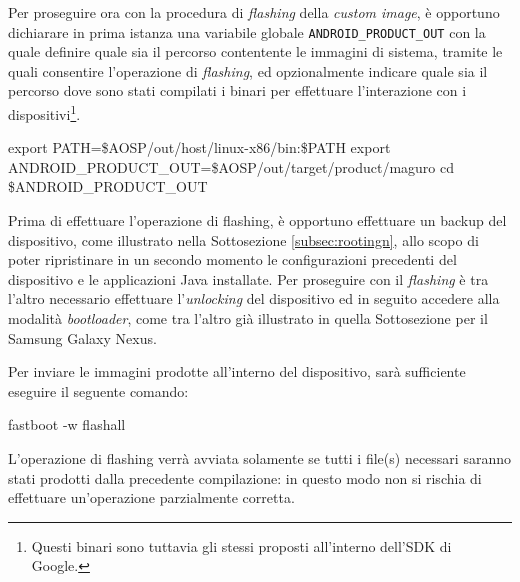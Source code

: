 Per proseguire ora con la procedura di \textit{flashing} della \textit{custom image},
è opportuno dichiarare in prima istanza una variabile globale \texttt{\small ANDROID\_PRODUCT\_OUT}
con la quale definire quale sia il percorso contentente le immagini di sistema,
tramite le quali consentire l'operazione di \textit{flashing}, ed opzionalmente indicare
quale sia il percorso dove sono stati compilati i binari per effettuare l'interazione
con i dispositivi\footnote{Questi binari sono tuttavia gli stessi proposti
all'interno dell'SDK di Google.}.
\begin{bash}
export PATH=\$AOSP/out/host/linux-x86/bin:\$PATH
export ANDROID_PRODUCT_OUT=\$AOSP/out/target/product/maguro
cd \$ANDROID_PRODUCT_OUT
\end{bash}
Prima di effettuare l'operazione di flashing, è opportuno effettuare un 
backup del dispositivo, come illustrato nella Sottosezione \vref{subsec:rootingn},
allo scopo di poter ripristinare in un secondo momento le configurazioni
precedenti del dispositivo e le applicazioni Java installate. Per proseguire
con il \textit{flashing} è tra l'altro necessario effettuare l'\textit{unlocking} del
dispositivo ed in seguito accedere alla modalità \textit{bootloader}, come tra l'altro
già illustrato in quella Sottosezione per il Samsung Galaxy Nexus.

Per inviare le immagini prodotte all'interno del dispositivo, sarà sufficiente
eseguire il seguente comando:
\begin{bash}
fastboot -w flashall
\end{bash}
L'operazione di flashing verrà avviata solamente se tutti i file(s) necessari
saranno stati prodotti dalla precedente compilazione: in questo modo non si 
rischia di effettuare un'operazione parzialmente corretta.
